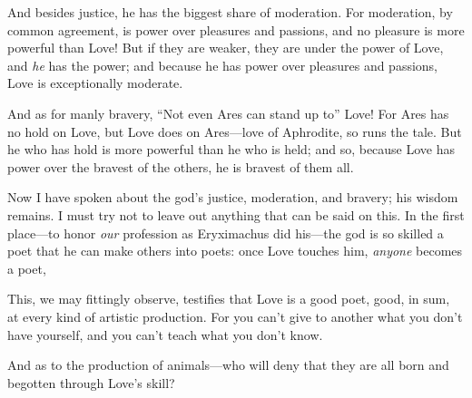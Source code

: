 And besides justice, he has the biggest share of
moderation. For
moderation, by common agreement, is power over pleasures and passions,
and no pleasure is more powerful than Love! But if they are weaker, they
are under the power of Love, and {\em he} has the power; and because he
has power over pleasures and passions, Love is exceptionally moderate.

And as for manly bravery, “Not even Ares can stand up to”
Love! For 
Ares has no hold on Love, but Love does on Ares---love of Aphrodite, so
runs the tale. But he
who has hold is more powerful than he who is held; and so, because Love
has power over the bravest of the others, he is bravest of them all.

Now I have spoken about the god's justice, moderation, and bravery; his
wisdom remains. I
must try not to leave out anything that can be said on this. In the
first place---to honor {\em our} profession as Eryximachus  did
his---the god is so
skilled a poet that he can make others into poets: once Love touches
him, {\em anyone} becomes a poet,

\blank[line]
\blank[line]

This, we may fittingly observe, testifies that Love is a good poet,
good, in sum, at every kind of artistic production. For you can't give
to another  what you don't have yourself, and you can't
teach what you don't know.

And as to the production of animals---who will deny that they are all
born and begotten through Love's skill?

